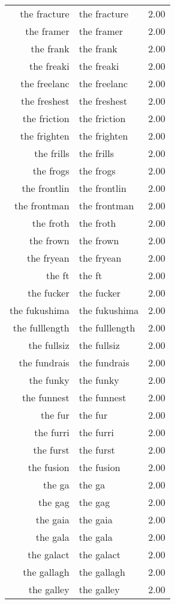 \begin{table}[ht]
\begin{tabular}{rlr}
  the fracture & the fracture & 2.00 \\ 
  the framer & the framer & 2.00 \\ 
  the frank & the frank & 2.00 \\ 
  the freaki & the freaki & 2.00 \\ 
  the freelanc & the freelanc & 2.00 \\ 
  the freshest & the freshest & 2.00 \\ 
  the friction & the friction & 2.00 \\ 
  the frighten & the frighten & 2.00 \\ 
  the frills & the frills & 2.00 \\ 
  the frogs & the frogs & 2.00 \\ 
  the frontlin & the frontlin & 2.00 \\ 
  the frontman & the frontman & 2.00 \\ 
  the froth & the froth & 2.00 \\ 
  the frown & the frown & 2.00 \\ 
  the fryean & the fryean & 2.00 \\ 
  the ft & the ft & 2.00 \\ 
  the fucker & the fucker & 2.00 \\ 
  the fukushima & the fukushima & 2.00 \\ 
  the fulllength & the fulllength & 2.00 \\ 
  the fullsiz & the fullsiz & 2.00 \\ 
  the fundrais & the fundrais & 2.00 \\ 
  the funky & the funky & 2.00 \\ 
  the funnest & the funnest & 2.00 \\ 
  the fur & the fur & 2.00 \\ 
  the furri & the furri & 2.00 \\ 
  the furst & the furst & 2.00 \\ 
  the fusion & the fusion & 2.00 \\ 
  the ga & the ga & 2.00 \\ 
  the gag & the gag & 2.00 \\ 
  the gaia & the gaia & 2.00 \\ 
  the gala & the gala & 2.00 \\ 
  the galact & the galact & 2.00 \\ 
  the gallagh & the gallagh & 2.00 \\ 
  the galley & the galley & 2.00 \\ 

\end{tabular}
\end{table}
